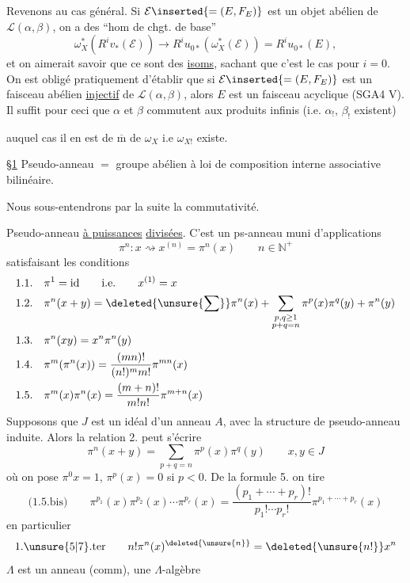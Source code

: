 Revenons au cas général. Si $\mathcal E\inserted{=(E,F_E)}$ est un objet abélien de $\mathcal L(\alpha,\beta)$, on a des ``hom de chgt. de base''
\[
\omega_X^*(R^iv_*(\mathcal E))\longrightarrow R^iu_{0*}(\omega_X^*(\mathcal E))=R^iu_{0*}(E),
\]
et on aimerait savoir que ce sont des \uline{isoms}, sachant que c'est le cas pour $i=0$. On est obligé pratiquement d'établir que  si $\mathcal E\inserted{=(E,F_E)}$ est un faisceau abélien \uline{injectif} de $\mathcal L(\alpha,\beta)$, alors $E$ est un faisceau acyclique  (SGA4 V\quad). Il suffit pour ceci que $\alpha$ et $\beta$ commutent aux produits infinis (i.e. $\alpha_!$, $\beta_!$ existent)


auquel cas il en est de $\overline{\mathrm m}$ de $\omega_X$ i.e $\omega_{X!}$ existe.




\uline{\S1} Pseudo-anneau $=$ groupe abélien à loi de composition interne associative bilinéaire.

Nous sous-entendrons par la suite la commutativité.

Pseudo-anneau  \uline{à puissances} \uline{divisées}. C'est un ps-anneau muni d'applications 
\[
\pi^n:x\rightsquigarrow x^{(n)}=\pi^n(x)\qquad n\in\mathbb N^+
\]
satisfaisant les conditions
\[
\begin{aligned}
1.1.\quad&\pi^1=\mathrm{id}\qquad\text{i.e.}\qquad x^{(1)}=x\\
1.2.\quad&\pi^n(x+y)=\deleted{\unsure{\sum}}\pi^n(x)+\sum_{\substack{p,q\ge1\\p+q=n}}\pi^p(x)\pi^q(y)+\pi^n(y)\\
1.3.\quad&\pi^n(xy)=x^n\pi^n(y)\\
1.4.\quad&\pi^m(\pi^n(x))=\frac{(mn)!}{(n!)^m m!}\pi^{mn}(x)\\
1.5.\quad&\pi^m(x)\pi^n(x)=\frac{(m+n)!}{m!n!}\pi^{m+n}(x)
\end{aligned}
\]
Supposons que $J$ est un idéal d'un anneau $A$, avec la structure de pseudo-anneau induite. Alors la relation 2. peut s'écrire
\[
\pi^n(x+y)=\sum_{p+q=n}\pi^p(x)\pi^q(y)\qquad x,y\in J
\]
où on pose $\pi^0x=1$, $\pi^p(x)=0$ si $p<0$. De la formule 5. on tire
\[
\text{(1.5.bis)}\qquad\pi^{p_1}(x)\pi^{p_2}(x)\cdots\pi^{p_r}(x)=\frac{(p_1+\cdots+p_r)!}{p_1!\cdots p_r!}\pi^{p_1+\cdots+p_r}(x)
\]
en particulier
\[
\text{1.\unsure{5|7}.ter}\qquad n!\pi^n(x)^{\deleted{\unsure{n}}}=\deleted{\unsure{n!}}x^n
\]
 $\Lambda$ est un anneau (comm), une $\Lambda$-algèbre


